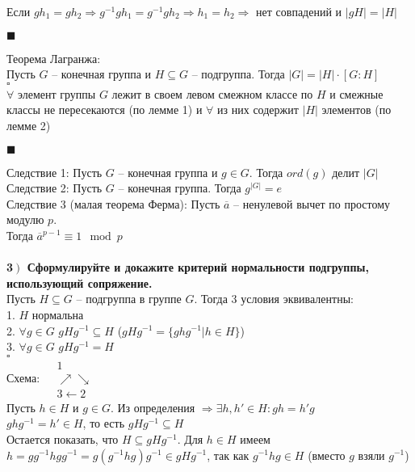 \documentclass[a4paper,12pt]{article}
\begin{document}
Если $gh_1=gh_2\Rightarrow g^{-1}gh_1=g^{-1}gh_2\Rightarrow h_1=h_2\Rightarrow$ нет совпадений и $|gH|=|H|$
\begin{flushright}
	$\blacksquare$
\end{flushright}
Теорема Лагранжа:\\
Пусть $G$ -- конечная группа и $H\subseteq G$ -- подгруппа. Тогда $|G|=|H|\cdot[G:H]$\\
$\square$\\
$\forall$ элемент группы $G$ лежит в своем левом смежном классе по $H$ и смежные классы не пересекаются (по лемме 1) и $\forall$ из них содержит $|H|$ элементов (по лемме 2)
\begin{flushright}
	$\blacksquare$
\end{flushright}
 Следствие 1: Пусть $G$ -- конечная группа и $g\in G$. Тогда $ord(g)$ делит $|G|$\\Следствие 2: Пусть $G$ -- конечная группа. Тогда $g^{|G|}=e$\\Следствие 3 (малая теорема Ферма):
Пусть $\overline a $ -- ненулевой вычет по простому модулю $p$.\\Тогда $\overline{a}^{p-1}\equiv1\mod p$\\ \\
\textbf{3$\left.\right)$ Сформулируйте и докажите критерий нормальности подгруппы, использующий сопряжение.}\\Пусть $H\subseteq G$ -- подгруппа в группе $G$. Тогда 3 условия эквивалентны:\\
1. $H$ нормальна\\
2. $\forall g\in G$ $gHg^{-1}\subseteq H$ ($gHg^{-1}=\{ghg^{-1}|h\in H \}$)\\
3. $\forall g\in G$ $gHg^{-1}=H$\\
$\square$\\
Схема:  $\begin{matrix}
&1&\\
&\nearrow\searrow&\\
&3\leftarrow2&
\end{matrix}\
$\\
 Пусть $h\in H$ и $g\in G$. Из определения $\Rightarrow\exists h, h'\in H:gh=h'g$\\
$ghg^{-1}=h'\in H$, то есть $gHg^{-1}\subseteq H$\\
 Остается показать, что $H\subseteq gHg^{-1}$. Для $h\in H$ имеем $h=gg^{-1}hgg^{-1}=g(g^{-1}hg)g^{-1}\in gHg^{-1}$, так как $g^{-1}hg\in H$ (вместо $g$ взяли $g^{-1}$)\\ \\ \\
\end{document}
